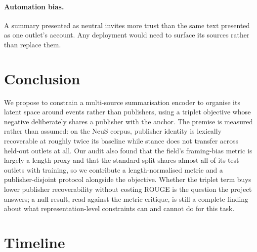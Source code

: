 \documentclass[11pt]{article}
\begin{document}
\paragraph{Automation bias.} A summary presented as neutral invites more trust
than the same text presented as one outlet's account. Any deployment would need
to surface its sources rather than replace them.

\section{Conclusion}

We propose to constrain a multi-source summarisation encoder to organise its
latent space around events rather than publishers, using a triplet objective
whose negative deliberately shares a publisher with the anchor. The premise is
measured rather than assumed: on the NeuS corpus, publisher identity is
lexically recoverable at roughly twice its baseline while stance does not
transfer across held-out outlets at all. Our audit also found that the field's
framing-bias metric is largely a length proxy and that the standard split shares
almost all of its test outlets with training, so we contribute a
length-normalised metric and a publisher-disjoint protocol alongside the
objective. Whether the triplet term buys lower publisher recoverability without
costing ROUGE is the question the project answers; a null result, read against
the metric critique, is still a complete finding about what representation-level
constraints can and cannot do for this task.

\section{Timeline}
\end{document}
